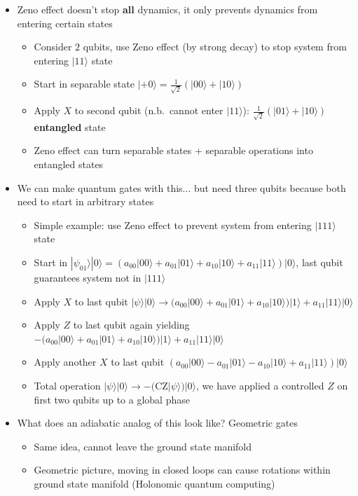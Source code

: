 \documentclass[english]{article}
\newcommand{\ket}[1]{|#1 \rangle}
\begin{document}
\begin{itemize}
\section{Non-trivial subsystems}
\item Zeno effect doesn't stop \textbf{all} dynamics, it only prevents dynamics from entering certain states
\begin{itemize}
\item Consider $2$ qubits, use Zeno effect (by strong decay) to stop system from entering $\ket{11}$ state
\item Start in separable state $\ket{+0}=\frac{1}{\sqrt{2}}(\ket{00}+\ket{10})$
\item Apply $X$ to second qubit (n.b.~cannot enter $\ket{11}$): $\frac{1}{\sqrt{2}}(\ket{01}+\ket{10})$ \textbf{entangled} state
\item Zeno effect can turn separable states + separable operations into entangled states
\end{itemize}
\item We can make quantum gates with this... but need three qubits because both need to start in arbitrary states
\begin{itemize}
\item Simple example: use Zeno effect to prevent system from entering $\ket{111}$ state 
\item Start in $\ket{\psi_{01}}\ket{0}=(a_{00}\ket{00}+a_{01}\ket{01}+a_{10}\ket{10}+a_{11}\ket{11})\ket{0}$, last qubit guarantees system not in $\ket{111}$
\item Apply $X$ to last qubit $\ket{\psi}\ket{0} \rightarrow (a_{00}\ket{00}+a_{01}\ket{01}+a_{10}\ket{10})\ket{1}+a_{11}\ket{11}\ket{0}$
\item Apply $Z$ to last qubit again yielding $-(a_{00}\ket{00}+a_{01}\ket{01}+a_{10}\ket{10})\ket{1}+a_{11}\ket{11}\ket{0}$
\item Apply another $X$ to last qubit $(a_{00}\ket{00}-a_{01}\ket{01}-a_{10}\ket{10}+a_{11}\ket{11})\ket{0}$
\item Total operation $\ket{\psi}\ket{0} \rightarrow -(\mathrm{CZ}\ket{\psi})\ket{0}$, we have applied a controlled $Z$ on first two qubits up to a global phase
\end{itemize}
\item What does an adiabatic analog of this look like? Geometric gates
\begin{itemize}
\item Same idea, cannot leave the ground state manifold
\item Geometric picture, moving in closed loops can cause rotations within ground state manifold (Holonomic quantum computing)

\end{itemize}
\end{itemize}
\end{document}

